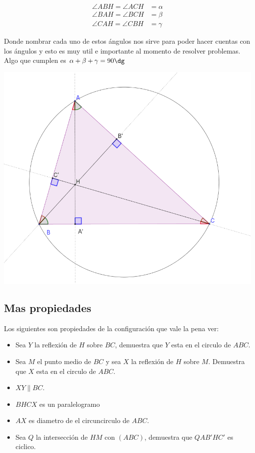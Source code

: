 \documentclass[11pt]{scrartcl}
\begin{document}
\begin{align*}
\angle ABH = \angle ACH &= \alpha \\
\angle BAH = \angle BCH &= \beta \\
\angle CAH = \angle CBH &= \gamma
\end{align*}

Donde nombrar cada uno de estos \'angulos nos sirve para poder hacer cuentas con los \'angulos
y esto es muy util e importante al momento de resolver problemas. \\

Algo que cumplen es $\alpha+\beta+\gamma=90\dg$

\begin{center}
    \includegraphics[scale=0.6]{PNAC11.png}
\end{center}




\subsection{Mas propiedades}

Los siguientes son propiedades de la configuraci\'on que vale la pena ver:

\begin{itemize}
    \item Sea $Y$ la reflexi\'on de $H$ sobre $BC$, demuestra que $Y$ esta en el circulo de $ABC$.
    \item Sea $M$ el punto medio de $BC$ y sea $X$ la reflexi\'on de $H$ sobre $M$. Demuestra que $X$ esta en el circulo de $ABC$.
    \item $XY \parallel BC$.
    \item $BHCX$ es un paralelogramo
    \item $AX$ es diametro de el circuncirculo de $ABC$.
    \item Sea $Q$ la intersecci\'on de $HM$ con $(ABC)$, demuestra que $QAB'HC'$ es ciclico.
\end{itemize}
\end{document}
